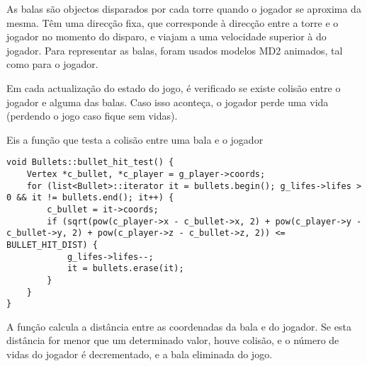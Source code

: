 As balas são objectos disparados por cada torre quando o jogador se aproxima da mesma.
Têm uma direcção fixa, que corresponde à direcção entre a torre e o jogador no momento do disparo, e viajam a uma velocidade superior à do jogador.
Para representar as balas, foram usados modelos MD2 animados, tal como para o jogador.

Em cada actualização do estado do jogo, é verificado se existe colisão entre o jogador e alguma das balas. Caso isso aconteça, o jogador perde uma vida (perdendo o jogo caso fique sem vidas).

Eis a função que testa a colisão entre uma bala e o jogador

\begin{lstlisting}
void Bullets::bullet_hit_test() {
    Vertex *c_bullet, *c_player = g_player->coords;
    for (list<Bullet>::iterator it = bullets.begin(); g_lifes->lifes > 0 && it != bullets.end(); it++) {
        c_bullet = it->coords;
        if (sqrt(pow(c_player->x - c_bullet->x, 2) + pow(c_player->y - c_bullet->y, 2) + pow(c_player->z - c_bullet->z, 2)) <= BULLET_HIT_DIST) {
            g_lifes->lifes--;
			it = bullets.erase(it);
        }
    }
}
\end{lstlisting}

A função calcula a distância entre as coordenadas da bala e do jogador. Se esta distância for menor que um determinado valor, houve colisão, e o número de vidas do jogador é decrementado, e a bala eliminada do jogo.
